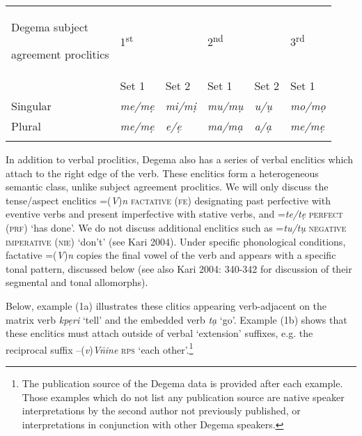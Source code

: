 \documentclass[output=paper]{langsci/langscibook}
\begin{document}
\begin{tabularx}{\textwidth}{XXXXXX}
\lsptoprule

{\mdseries Degema subject }

{\mdseries agreement proclitics} & \multicolumn{2}{X}{ 1\textsuperscript{st}\par

} & \multicolumn{2}{X}{ 2\textsuperscript{nd}\par

} & 3\textsuperscript{rd}\par\\
\hhline{-~~~~~} & {\mdseries Set 1} & {\mdseries Set 2} & {\mdseries Set 1} & {\mdseries Set 2} & {\mdseries Set 1}\\
{\mdseries Singular} & {\itshape me/mẹ} & {\itshape mi/mị} & {\itshape mu/mụ} & {\itshape u/ụ} & {\itshape mo/mọ}\\
{\mdseries Plural} & {\itshape me/mẹ} & {\itshape e/ẹ} & {\itshape ma/mạ} & {\itshape a/ạ} & {\itshape me/mẹ}\\
\lspbottomrule
\end{tabularx}
In addition to verbal proclitics, Degema also has a series of verbal enclitics which attach to the right edge of the verb. These enclitics form a heterogeneous semantic class, unlike subject agreement proclitics. We will only discuss the tense/aspect enclitics =(\textit{V})\textit{n} \textsc{factative (fe) }designating past perfective with eventive verbs and present imperfective with stative verbs, and =\textit{te/tẹ} \textsc{perfect} (\textsc{prf}) ‘has done’. We do not discuss additional enclitics such as =\textit{tu/tụ} \textsc{negative imperative (nie)} ‘don’t’ (see Kari 2004). Under specific phonological conditions, factative =(\textit{V})\textit{n} copies the final vowel of the verb and appears with a specific tonal pattern, discussed below (see also Kari 2004: 340-342 for discussion of their segmental and tonal allomorphs).   

  Below, example (1a) illustrates these clitics appearing verb-adjacent on the matrix verb \textit{kpẹri }‘tell’ and the embedded verb \textit{tạ} ‘go’. Example (1b) shows that these enclitics must attach outside of verbal ‘extension’ suffixes, e.g. the reciprocal suffix –(\textit{v})\textit{V\={n}ine} \textsc{rps} ‘each other’.\footnote{The publication source of the Degema data is provided after each example. Those examples which do not list any publication source are native speaker interpretations by the second author not previously published, or interpretations in conjunction with other Degema speakers. 
}
\end{document}
